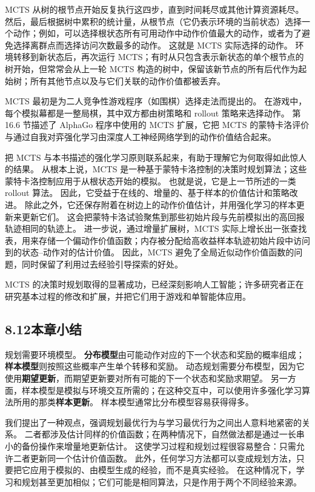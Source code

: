 \documentclass[UTF8, 12pt, fontset=fandol, oneside]{ctexart}
\begin{document}
MCTS 从树的根节点开始反复执行这四步，直到时间耗尽或其他计算资源耗尽。
然后，最后根据树中累积的统计量，从根节点（它仍表示环境的当前状态）选择一个动作；例如，可以选择根状态所有可用动作中动作价值最大的动作，或者为了避免选择离群点而选择访问次数最多的动作。
这就是 MCTS 实际选择的动作。
环境转移到新状态后，再次运行 MCTS；有时从只包含表示新状态的单个根节点的树开始，但常常会从上一轮 MCTS 构造的树中，保留该新节点的所有后代作为起始树；所有其他节点以及与它们关联的动作价值都被丢弃。

MCTS 最初是为二人竞争性游戏程序（如围棋）选择走法而提出的。
在游戏中，每个模拟幕都是一整局棋，其中双方都由树策略和 rollout 策略来选择动作。
第 16.6 节描述了 AlphaGo 程序中使用的 MCTS 扩展，它把 MCTS 的蒙特卡洛评价与通过自我对弈强化学习由深度人工神经网络学到的动作价值结合起来。

把 MCTS 与本书描述的强化学习原则联系起来，有助于理解它为何取得如此惊人的结果。
从根本上说，MCTS 是一种基于蒙特卡洛控制的决策时规划算法；这些蒙特卡洛控制应用于从根状态开始的模拟。
也就是说，它是上一节所述的一类 rollout 算法。
因此，它受益于在线的、增量的、基于样本的价值估计和策略改进。
除此之外，它还保存附着在树边上的动作价值估计，并用强化学习的样本更新来更新它们。
这会把蒙特卡洛试验聚焦到那些初始片段与先前模拟出的高回报轨迹相同的轨迹上。
进一步说，通过增量扩展树，MCTS 实际上增长出一张查找表，用来存储一个偏动作价值函数；内存被分配给高收益样本轨迹初始片段中访问到的状态--动作对的估计价值。
因此，MCTS 避免了全局近似动作价值函数的问题，同时保留了利用过去经验引导探索的好处。

MCTS 的决策时规划取得的显著成功，已经深刻影响人工智能；许多研究者正在研究基本过程的修改和扩展，并把它们用于游戏和单智能体应用。

\subsection*{8.12\quad 本章小结}

规划需要环境模型。
\textbf{分布模型}由可能动作对应的下一个状态和奖励的概率组成；\textbf{样本模型}则按照这些概率产生单个转移和奖励。
动态规划需要分布模型，因为它使用\textbf{期望更新}，而期望更新要对所有可能的下一个状态和奖励求期望。
另一方面，样本模型是模拟与环境交互所需的；在这种交互中，可以使用许多强化学习算法所用的那类\textbf{样本更新}。
样本模型通常比分布模型容易获得得多。

我们提出了一种观点，强调规划最优行为与学习最优行为之间出人意料地紧密的关系。
二者都涉及估计同样的价值函数；在两种情况下，自然做法都是通过一长串小的备份操作来增量地更新估计。
这使学习过程和规划过程很容易整合：只需允许二者更新同一个估计价值函数。
此外，任何学习方法都可以变成规划方法，只要把它应用于模拟的、由模型生成的经验，而不是真实经验。
在这种情况下，学习和规划甚至更加相似；它们可能是相同算法，只是作用于两个不同经验来源。
\end{document}
